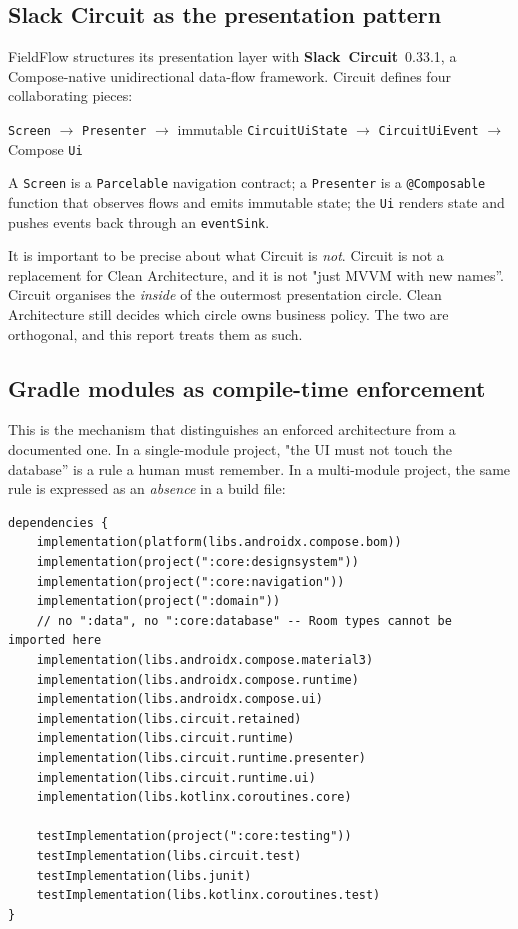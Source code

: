 \documentclass[11pt,a4paper]{article}
\newcommand{\mdl}[1]{\texttt{#1}}
\newcommand{\file}[1]{{\small\texttt{#1}}}
\begin{document}
\subsection{Slack Circuit as the presentation pattern}

FieldFlow structures its presentation layer with
\textbf{Slack~Circuit}~0.33.1, a Compose-native unidirectional data-flow
framework. Circuit defines four collaborating pieces:

\begin{center}
\texttt{Screen} $\rightarrow$ \texttt{Presenter} $\rightarrow$ immutable
\texttt{CircuitUiState} $\rightarrow$ \texttt{CircuitUiEvent} $\rightarrow$
Compose \texttt{Ui}
\end{center}

A \texttt{Screen} is a \texttt{Parcelable} navigation contract; a
\texttt{Presenter} is a \texttt{@Composable} function that observes flows and
emits immutable state; the \texttt{Ui} renders state and pushes events back
through an \texttt{eventSink}.

It is important to be precise about what Circuit is \emph{not}. Circuit is not a
replacement for Clean Architecture, and it is not "just MVVM with new names''.
Circuit organises the \emph{inside} of the outermost presentation circle. Clean
Architecture still decides which circle owns business policy. The two are
orthogonal, and this report treats them as such.

\subsection{Gradle modules as compile-time enforcement}

This is the mechanism that distinguishes an enforced architecture from a
documented one. In a single-module project, "the UI must not touch the
database'' is a rule a human must remember. In a multi-module project, the same
rule is expressed as an \emph{absence} in a build file:

\begin{lstlisting}[caption={\file{feature/inspection/build.gradle.kts} --- the
inspection feature can see the domain and shared UI, but \mdl{:data} and
\mdl{:core:database} are simply not on its compile classpath.}]
dependencies {
    implementation(platform(libs.androidx.compose.bom))
    implementation(project(":core:designsystem"))
    implementation(project(":core:navigation"))
    implementation(project(":domain"))
    // no ":data", no ":core:database" -- Room types cannot be imported here
    implementation(libs.androidx.compose.material3)
    implementation(libs.androidx.compose.runtime)
    implementation(libs.androidx.compose.ui)
    implementation(libs.circuit.retained)
    implementation(libs.circuit.runtime)
    implementation(libs.circuit.runtime.presenter)
    implementation(libs.circuit.runtime.ui)
    implementation(libs.kotlinx.coroutines.core)

    testImplementation(project(":core:testing"))
    testImplementation(libs.circuit.test)
    testImplementation(libs.junit)
    testImplementation(libs.kotlinx.coroutines.test)
}
\end{lstlisting}
\end{document}
